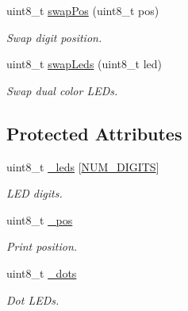 \begin{DoxyCompactItemize}
uint8\+\_\+t \hyperlink{class_l_k_m1638_board_a36bc06324f7f4bb412d42338e4adfb18}{swap\+Pos} (uint8\+\_\+t pos)
\begin{DoxyCompactList}\small\item\em Swap digit position. \end{DoxyCompactList}\item 
uint8\+\_\+t \hyperlink{class_l_k_m1638_board_a9526953f337a0f5780c963f5e37a77d3}{swap\+Leds} (uint8\+\_\+t led)
\begin{DoxyCompactList}\small\item\em Swap dual color L\+ED\textquotesingle{}s. \end{DoxyCompactList}\end{DoxyCompactItemize}
\subsection*{Protected Attributes}
\begin{DoxyCompactItemize}
\item 
uint8\+\_\+t \hyperlink{class_l_k_m1638_board_ad0ecb25b0069693153b4c99b1fd0c0c6}{\+\_\+leds} \mbox{[}\hyperlink{_l_k_m1638_board_8h_a0b79fa1bdb1363440df485691386a74c}{N\+U\+M\+\_\+\+D\+I\+G\+I\+TS}\mbox{]}\hypertarget{class_l_k_m1638_board_ad0ecb25b0069693153b4c99b1fd0c0c6}{}\label{class_l_k_m1638_board_ad0ecb25b0069693153b4c99b1fd0c0c6}

\begin{DoxyCompactList}\small\item\em L\+ED digits. \end{DoxyCompactList}\item 
uint8\+\_\+t \hyperlink{class_l_k_m1638_board_a1dc0720aa961510a147cb7e3db7d7873}{\+\_\+pos}\hypertarget{class_l_k_m1638_board_a1dc0720aa961510a147cb7e3db7d7873}{}\label{class_l_k_m1638_board_a1dc0720aa961510a147cb7e3db7d7873}

\begin{DoxyCompactList}\small\item\em Print position. \end{DoxyCompactList}\item 
uint8\+\_\+t \hyperlink{class_l_k_m1638_board_a2de77cd6c33672edb5a3288b09cdcbfc}{\+\_\+dots}\hypertarget{class_l_k_m1638_board_a2de77cd6c33672edb5a3288b09cdcbfc}{}\label{class_l_k_m1638_board_a2de77cd6c33672edb5a3288b09cdcbfc}

\begin{DoxyCompactList}\small\item\em Dot L\+ED\textquotesingle{}s. \end{DoxyCompactList}\end{DoxyCompactItemize}


